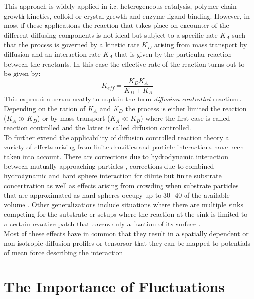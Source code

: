 This approach is widely applied in i.e. heterogeneous catalysis, polymer chain growth kinetics, colloid or crystal growth and enzyme ligand binding. However, in most if these applications the reaction that takes place on encounter of the different diffusing components is not ideal but subject to a specific rate $K_A$ such that the process is governed by a kinetic rate $K_D$ arising from mass transport by diffusion and an interaction rate $K_A$ that is given by the particular reaction between the reactants. In this case the effective rate of the reaction turns out to be given by:
\begin{equation}
    K_{eff} = \frac{K_D K_A}{K_D + K_A}
    \label{KeffIntro}
\end{equation}
This expression serves neatly to explain the term \emph{diffusion controlled} reactions. Depending on the ration of $K_A$ and $K_D$ the process is either limited the reaction ($K_A \gg K_D$) or by mass transport ($K_A \ll K_D$) where the first case is called reaction controlled and the latter is called diffusion controlled. \\

To further extend the applicability of diffusion controlled reaction theory a variety of effects arising from finite densities and particle interactions have been taken into account. There are corrections due to hydrodynamic interaction between mutually approaching particles \cite{Friedman1966, Wolyes1976}, corrections due to combined hydrodynamic and hard sphere interaction for dilute but finite substrate concentration \cite{Dzubiella2005} as well as effects arising from crowding when substrate particles that are approximated as hard spheres occupy up to 30 -40 of the available volume \cite{Dorsaz2010}. Other generalizations include situations where there are multiple sinks competing for the substrate \cite{Reck1968a, Reck1968b} or setups where the reaction at the sink is limited to a certain reactive patch that covers only a fraction of its surface \cite{schmitz1972role, schurr1976, shoup1981diffusion, shoup1982role}. \\
Most of these effects have in common that they result in a spatially dependent or non isotropic diffusion profiles or tensorsor that they can be mapped to potentials of mean force describing the interaction
\newpage
\section{The Importance of Fluctuations}

